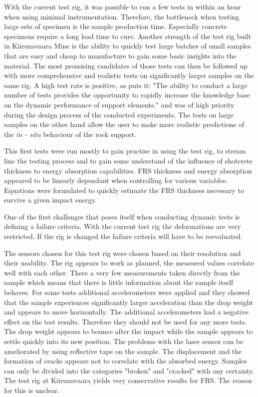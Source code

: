 With the current test rig, it was possible to run a few tests in within an hour when using minimal instrumentation. Therefore, the bottleneck when testing large sets of specimen is the sample production time. Especially concrete specimens require a long lead time to cure. Another strength of the test rig built in Kiirunavaara Mine is the ability to quickly test large batches of small samples that are easy and cheap to manufacture to gain some basic insights into the material. The most promising candidates of those tests can then be followed up with more comprehensive and realistic tests on significantly larger samples on the same rig.
A high test rate is positive, as \textcite[14]{Crompton18} puts it: "The ability to conduct a large number of tests provides the opportunity to rapidly increase the knowledge base on the dynamic performance of support elements." and was of high priority during the design process of the conducted experiments.
The tests on large samples on the other hand allow the user to make more realistic predictions of the \textit{in - situ} behaviour of the rock support.

This first tests were run mostly to gain practise in using the test rig, to stream line the testing process and to gain some understand of the influence of shotcrete thickness to energy absorption capabilities. FRS thickness and energy absorption appeared to be linearly dependant when controlling for various variables. Equations were formulated to quickly estimate the FRS thickness necessary to survive a given impact energy.

One of the first challenges that poses itself when conducting dynamic tests is defining a failure criteria. With the current test rig the deformations are very restricted. If the rig is changed the failure criteria will have to be reevaluated.

The sensors chosen for this test rig were chosen based on their resolution and their usability. The rig appears to work as planned, the measured values correlate well with each other. There a very few measurements taken directly from the sample which means that there is little information about the sample itself behaves. %
For some tests additional accelerometers were applied and they showed that the sample experiences significantly larger acceleration than the drop weight and appears to move horizontally. The additional accelerometers had a negative effect on the test results. Therefore they should not be used for any more tests.
The drop weight appears to bounce after the impact while the sample appears to settle quickly into its new position. The problems with the laser sensor can be ameliorated by using reflective tape on the sample. The displacement and the formation of cracks appears not to correlate with the absorbed energy. Samples can only be divided into the categories "broken" and "cracked" with any certainty. 
The test rig at Kiirunavaara yields very conservative results for FRS. The reason for this is unclear.

